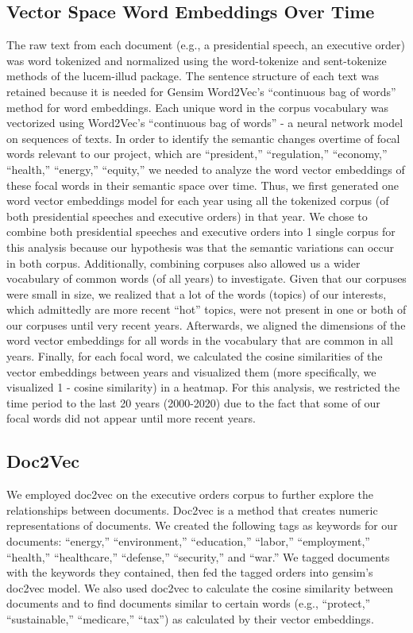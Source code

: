 \documentclass{article}
\begin{document}
{\subsection{Vector Space Word Embeddings Over Time}{The raw text from each document (e.g., a presidential speech, an executive order) was word tokenized and normalized using the word-tokenize and sent-tokenize methods of the lucem-illud package. The sentence structure of each text was retained because it is needed for Gensim Word2Vec’s “continuous bag of words” method for word embeddings. Each unique word in the corpus vocabulary was vectorized using Word2Vec’s “continuous bag of words” - a neural network model on sequences of texts. 
In order to identify the semantic changes overtime of focal words relevant to our project, which are “president,” “regulation,” “economy,” “health,” “energy,” “equity,” we needed to analyze the word vector embeddings of these focal words in their semantic space over time. Thus, we first generated one word vector embeddings model for each year using all the tokenized corpus (of both presidential speeches and executive orders) in that year. We chose to combine both presidential speeches and executive orders into 1 single corpus for this analysis because our hypothesis was that the semantic variations can occur in both corpus. Additionally, combining corpuses also allowed us a wider vocabulary of common words (of all years) to investigate. Given that our corpuses were small in size, we realized that a lot of the words (topics) of our interests, which admittedly are more recent “hot” topics, were not present in one or both of our corpuses until very recent years.
Afterwards, we aligned the dimensions of the word vector embeddings for all words in the vocabulary that are common in all years. Finally, for each focal word, we calculated the cosine similarities of the vector embeddings between years and visualized them (more specifically, we visualized 1 - cosine similarity) in a heatmap. For this analysis, we restricted the time period to the last 20 years (2000-2020) due to the fact that some of our focal words did not appear until more recent years.}

\subsection{Doc2Vec}{We employed doc2vec on the executive orders corpus to further explore the relationships between documents. Doc2vec is a method that creates numeric representations of documents. We created the following tags as keywords for our documents: “energy,” “environment,” “education,” “labor,” “employment,” “health,” “healthcare,” “defense,” “security,” and “war.” We tagged documents with the keywords they contained, then fed the tagged orders into gensim’s doc2vec model. We also used doc2vec to calculate the cosine similarity between documents and to find documents similar to certain words (e.g., “protect,” “sustainable,” “medicare,” “tax”) as calculated by their vector embeddings.}



}
\end{document}
